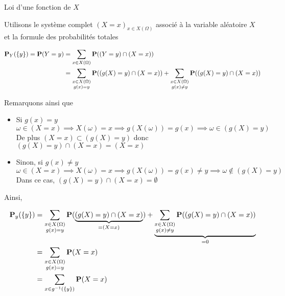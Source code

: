 \documentclass{article}
\begin{document}
\begin{question_kholle}[{
	Soit $X$ une variable alétoire sur $\Omega$ et $g$ une fonction définie sur $X(\Omega)$.
	La loi de probabilité $Y = g(X)$ est donnée par $Y(\Omega) = g(X(\Omega))$ et 
	$$
	\forall y \in Y(\Omega), \proba_{Y}(\{ y \})= \proba(Y=y) = \sum_{x \in g^{-1}(\{ y \})}\proba(X=x)= \sum_{\substack{x \in X(\Omega)\\ g(x)=y}}\proba(X=x)
	$$
	}]{Loi d'une fonction de $X$}
	
	Utilisons le système complet $(X = x)_{x \in X(\Omega)}$ associé à la variable aléatoire $X$ et la formule des probabilités totales
	
	\begin{align*}
		\mathbf P_{Y}(\{ y \}) = \mathbf P(Y=y) &= \sum_{x \in X(\Omega)}\mathbf P((Y=y) \cap (X=x)) \\
		&= \sum_{\substack{x \in X(\Omega)\\ g(x)=y}}\mathbf P((g(X)=y) \cap (X=x)) + \sum_{\substack{x \in X(\Omega)\\ g(x)\neq y}}\mathbf P((g(X)=y) \cap (X=x))
	\end{align*}
	
	
	Remarquons ainsi que
	\begin{itemize}[label=$\star$]
		\item Si $g(x) = y$
		$$
		\omega \in(X=x) \implies X(\omega)=x \implies g(X(\omega)) = g(x) \implies \omega \in (g(X) = y)
		$$
		De plus $(X = x) \subset (g(X)=y)$ donc $(g(X) = y) \cap(X=x)=(X=x)$
		
		\item Sinon, si $g(x) \neq y$
		$$
		\omega \in (X=x) \implies X(\omega) = x \implies g(X(\omega)) = g(x) \neq y \implies \omega \not\in (g(X) = y)
		$$
		Dans ce cas, $(g(X) = y) \cap (X = x) = \emptyset$
		
	\end{itemize}
	Ainsi, 
	
	\begin{align*}
		\mathbf P_{y}(\{ y \}) &= \sum_{\substack{x \in X(\Omega)\\ g(x)=y}}\mathbf P(\underbrace{ (g(X)=y) \cap (X=x) }_{ = (X=x) }) + \underbrace{ \sum_{\substack{x \in X(\Omega)\\ g(x)\neq y}}\mathbf P((g(X)=y) \cap (X=x)) }_{ =0 }\\
		&= \sum_{\substack{x \in X(\Omega)\\ g(x)=y}}\mathbf P(X=x) \\
		&= \sum_{x \in g^{-1}(\{ y \})}\mathbf P(X=x)
	\end{align*}
	
	
\end{question_kholle}
\end{document}
